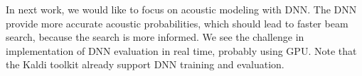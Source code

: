 In next work, we would like to focus on acoustic modeling with \acl{DNN}.
The \ac{DNN} provide more accurate acoustic probabilities, 
which should lead to faster beam search,
because the search is more informed.\cite{TODO_DNN} 
We see the challenge in implementation of \acl{DNN} evaluation in real time, probably using \ac{GPU}.
Note that the Kaldi toolkit already support \ac{DNN} training and evaluation.
